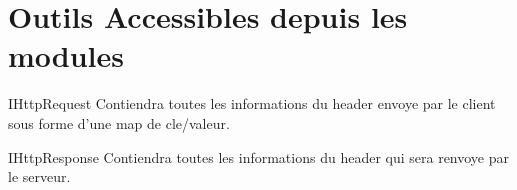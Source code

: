   \chapter{Outils Accessibles depuis les modules}
    \begin{figure}[h!]
    \end{figure}

    IHttpRequest Contiendra toutes les informations du header envoye par le client sous forme d'une map de cle/valeur.

    \begin{figure}[h!]
    \end{figure}

    \newpage

    IHttpResponse Contiendra toutes les informations du header qui sera renvoye par le serveur.

